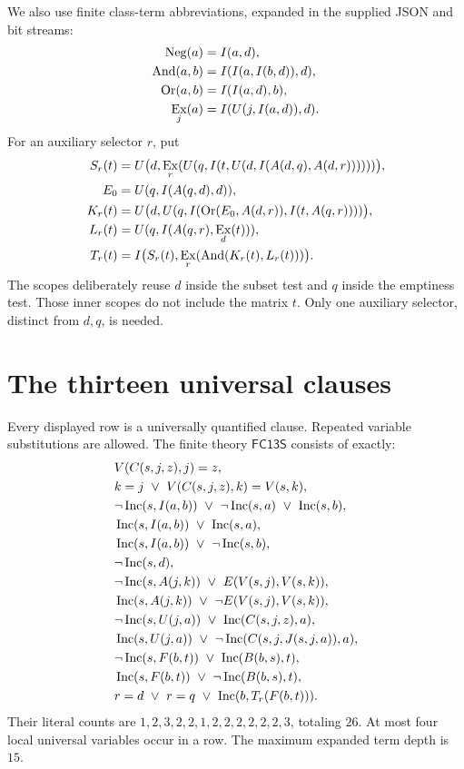 \documentclass[11pt]{article}
\newcommand{\Inc}{\mathop{\rm Inc}}
\newcommand{\FC}{\ensuremath{\mathsf{FC13S}}}
\newcommand{\Neg}[1]{\mathop{\rm Neg}(#1)}
\newcommand{\ClassAnd}[2]{\mathop{\rm And}(#1,#2)}
\newcommand{\Or}[2]{\mathop{\rm Or}(#1,#2)}
\newcommand{\Ex}[2]{\mathop{\rm Ex}_{#1}(#2)}
\begin{document}
We also use finite class-term abbreviations, expanded in the supplied JSON
and bit streams:
\begin{align*}
 \Neg{a}&=I(a,d),\\
 \ClassAnd{a}{b}&=I(I(a,I(b,d)),d),\\
 \Or{a}{b}&=I(I(a,d),b),\\
 \Ex{j}{a}&=I(U(j,I(a,d)),d).
\end{align*}
For an auxiliary selector $r$, put
\begin{align*}
 S_r(t)&=U\bigl(d,\Ex{r}{U(q,I(t,U(d,I(A(d,q),A(d,r)))))}\bigr),\\
 E_0&=U(q,I(A(q,d),d)),\\
 K_r(t)&=U\bigl(d,U(q,I(\Or{E_0}{A(d,r)},I(t,A(q,r))))\bigr),\\
 L_r(t)&=U(q,I(A(q,r),\Ex{d}{t})),\\
 T_r(t)&=I\bigl(S_r(t),\Ex{r}{\ClassAnd{K_r(t)}{L_r(t)}}\bigr).
\end{align*}
The scopes deliberately reuse $d$ inside the subset test and $q$ inside
the emptiness test.  Those inner scopes do not include the matrix $t$.
Only one auxiliary selector, distinct from $d,q$, is needed.

\section{The thirteen universal clauses}

Every displayed row is a universally quantified clause.  Repeated variable
substitutions are allowed.  The finite theory $\FC$ consists of exactly:
\begin{align}
 &V(C(s,j,z),j)=z,\\
 &k=j\ \lor\ V(C(s,j,z),k)=V(s,k),\\
 &\neg\Inc(s,I(a,b))\ \lor\ \neg\Inc(s,a)\ \lor\ \Inc(s,b),\\
 &\Inc(s,I(a,b))\ \lor\ \Inc(s,a),\\
 &\Inc(s,I(a,b))\ \lor\ \neg\Inc(s,b),\\
 &\neg\Inc(s,d),\\
 &\neg\Inc(s,A(j,k))\ \lor\ E(V(s,j),V(s,k)),\\
 &\Inc(s,A(j,k))\ \lor\ \neg E(V(s,j),V(s,k)),\\
 &\neg\Inc(s,U(j,a))\ \lor\ \Inc(C(s,j,z),a),\\
 &\Inc(s,U(j,a))\ \lor\ \neg\Inc(C(s,j,J(s,j,a)),a),\\
 &\neg\Inc(s,F(b,t))\ \lor\ \Inc(B(b,s),t),\\
 &\Inc(s,F(b,t))\ \lor\ \neg\Inc(B(b,s),t),\\
 &r=d\ \lor\ r=q\ \lor\ \Inc(b,T_r(F(b,t))).
\end{align}
Their literal counts are
$1,2,3,2,2,1,2,2,2,2,2,2,3$, totaling $26$.
At most four local universal variables occur in a row.  The maximum
expanded term depth is $15$.
\end{document}
